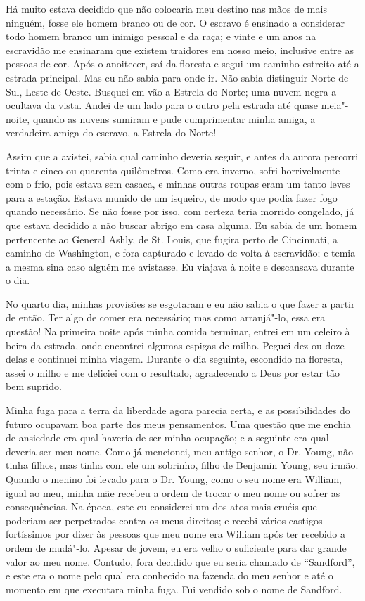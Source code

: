 Há muito estava decidido que não colocaria meu destino nas mãos de mais
ninguém, fosse ele homem branco ou de cor. O escravo é ensinado a
considerar todo homem branco um inimigo pessoal e da raça; e vinte e um
anos na escravidão me ensinaram que existem traidores em nosso meio,
inclusive entre as pessoas de cor. Após o anoitecer, saí da floresta e
segui um caminho estreito até a estrada principal. Mas eu não sabia para
onde ir. Não sabia distinguir Norte de Sul, Leste de Oeste. Busquei em
vão a Estrela do Norte; uma nuvem negra a ocultava da vista. Andei de um
lado para o outro pela estrada até quase meia"-noite, quando as nuvens
sumiram e pude cumprimentar minha amiga, a verdadeira amiga do escravo,
a Estrela do Norte!

Assim que a avistei, sabia qual caminho deveria seguir, e antes da
aurora percorri trinta e cinco ou quarenta quilômetros. Como era
inverno, sofri horrivelmente com o frio, pois estava sem casaca, e
minhas outras roupas eram um tanto leves para a estação. Estava munido
de um isqueiro, de modo que podia fazer fogo quando necessário. Se não
fosse por isso, com certeza teria morrido congelado, já que estava
decidido a não buscar abrigo em casa alguma. Eu sabia de um homem
pertencente ao General Ashly, de St. Louis, que fugira perto de
Cincinnati, a caminho de Washington, e fora capturado e levado de volta
à escravidão; e temia a mesma sina caso alguém me avistasse. Eu viajava
à noite e descansava durante o dia.

No quarto dia, minhas provisões se esgotaram e eu não sabia o que fazer
a partir de então. Ter algo de comer era necessário; mas como
arranjá"-lo, essa era questão! Na primeira noite após minha comida
terminar, entrei em um celeiro à beira da estrada, onde encontrei
algumas espigas de milho. Peguei dez ou doze delas e continuei minha
viagem. Durante o dia seguinte, escondido na floresta, assei o milho e
me deliciei com o resultado, agradecendo a Deus por estar tão bem
suprido.

Minha fuga para a terra da liberdade agora parecia certa, e as
possibilidades do futuro ocupavam boa parte dos meus pensamentos. Uma
questão que me enchia de ansiedade era qual haveria de ser minha
ocupação; e a seguinte era qual deveria ser meu nome. Como já mencionei,
meu antigo senhor, o Dr. Young, não tinha filhos, mas tinha com ele um
sobrinho, filho de Benjamin Young, seu irmão. Quando o menino foi levado
para o Dr. Young, como o seu nome era William, igual ao meu, minha mãe
recebeu a ordem de trocar o meu nome ou sofrer as consequências. Na
época, este eu considerei um dos atos mais cruéis que poderiam ser
perpetrados contra os meus direitos; e recebi vários castigos
fortíssimos por dizer às pessoas que meu nome era William após ter
recebido a ordem de mudá"-lo. Apesar de jovem, eu era velho o suficiente
para dar grande valor ao meu nome. Contudo, fora decidido que eu seria
chamado de ``Sandford'', e este era o nome pelo qual era conhecido na
fazenda do meu senhor e até o momento em que executara minha fuga. Fui
vendido sob o nome de Sandford.

